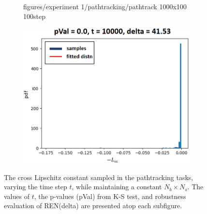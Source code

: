 \documentclass[conference]{IEEEtran}
\newcommand{\ren}{\textsc{REN}\xspace}
\newcommand{\red}[1]{\textcolor{red}{#1}}
\newcommand{\todo}[1]{\red{TODO: #1}}
\begin{document}
\begin{figure}[htbp]
\begin{subfigure}[b]{0.15\textwidth}
    {figures/experiment 1/pathtracking/pathtrack 1000x100 100step}
    \caption{}
  \end{subfigure}
  \hfill
  \begin{subfigure}[b]{0.15\textwidth}
    \includegraphics[width=\textwidth]
    {figures/experiment 1/pathtracking/pathtrack 1000x100 10000steps}
    \caption{}
  \end{subfigure}
  \caption{
  The cross Lipschitz constant sampled in the 
  pathtracking tasks, varying the time step $t$, 
  while maintaining a constant $N_b\times N_s$. 
  The values of $t$, the p-values 
  (pVal) from K-S test, and 
  robustness evaluation of \ren (delta) 
  are presented atop each 
  subfigure. 
}
  \label{fig:experiment1.2}
\end{figure}


\end{document}
